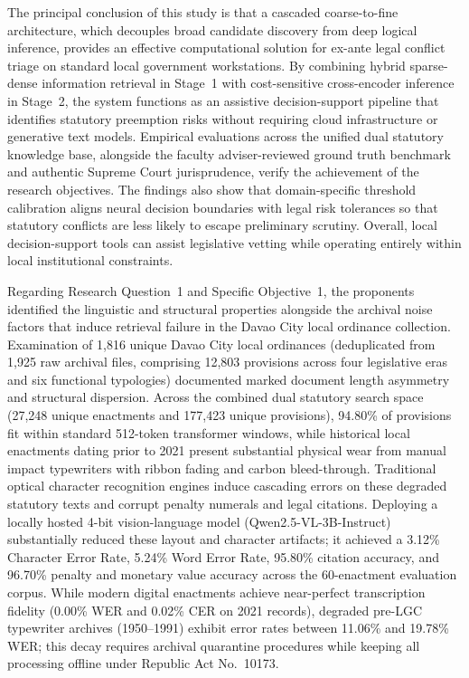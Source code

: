 The principal conclusion of this study is that a cascaded coarse-to-fine architecture, which decouples broad candidate discovery from deep logical inference, provides an effective computational solution for ex-ante legal conflict triage on standard local government workstations. By combining hybrid sparse-dense information retrieval in Stage~1 with cost-sensitive cross-encoder inference in Stage~2, the system functions as an assistive decision-support pipeline that identifies statutory preemption risks without requiring cloud infrastructure or generative text models. Empirical evaluations across the unified dual statutory knowledge base, alongside the faculty adviser-reviewed ground truth benchmark and authentic Supreme Court jurisprudence, verify the achievement of the research objectives. The findings also show that domain-specific threshold calibration aligns neural decision boundaries with legal risk tolerances so that statutory conflicts are less likely to escape preliminary scrutiny. Overall, local decision-support tools can assist legislative vetting while operating entirely within local institutional constraints.

Regarding Research Question~1 and Specific Objective~1, the proponents identified the linguistic and structural properties alongside the archival noise factors that induce retrieval failure in the Davao City local ordinance collection. Examination of 1,816 unique Davao City local ordinances (deduplicated from 1,925 raw archival files, comprising 12,803 provisions across four legislative eras and six functional typologies) documented marked document length asymmetry and structural dispersion. Across the combined dual statutory search space (27,248 unique enactments and 177,423 unique provisions), 94.80\% of provisions fit within standard 512-token transformer windows, while historical local enactments dating prior to 2021 present substantial physical wear from manual impact typewriters with ribbon fading and carbon bleed-through. Traditional optical character recognition engines induce cascading errors on these degraded statutory texts and corrupt penalty numerals and legal citations. Deploying a locally hosted 4-bit vision-language model (Qwen2.5-VL-3B-Instruct) substantially reduced these layout and character artifacts; it achieved a 3.12\% Character Error Rate, 5.24\% Word Error Rate, 95.80\% citation accuracy, and 96.70\% penalty and monetary value accuracy across the 60-enactment evaluation corpus. While modern digital enactments achieve near-perfect transcription fidelity (0.00\% WER and 0.02\% CER on 2021 records), degraded pre-LGC typewriter archives (1950--1991) exhibit error rates between 11.06\% and 19.78\% WER; this decay requires archival quarantine procedures while keeping all processing offline under Republic Act No.~10173.

